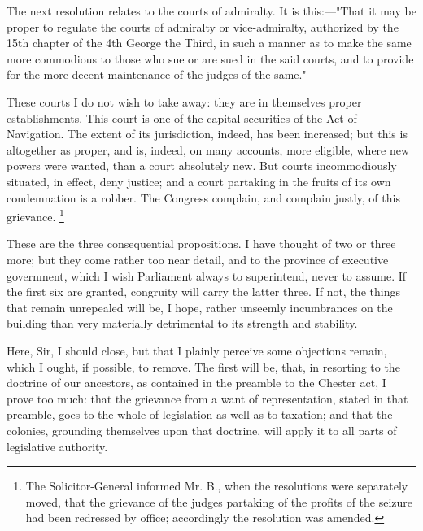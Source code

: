 The next resolution relates to the courts of admiralty. It is this:—"That it may be proper to regulate the courts of admiralty or vice-admiralty, authorized by the 15th chapter of the 4th George the Third, in such a manner as to make the same more commodious to those who sue or are sued in the said courts, and to provide for the more decent maintenance of the judges of the same."

These courts I do not wish to take away: they are in themselves proper establishments. This court is one of the capital securities of the Act of Navigation. The extent of its jurisdiction, indeed, has been increased; but this is altogether as proper, and is, indeed, on many accounts, more eligible, where new powers were wanted, than a court absolutely new. But courts incommodiously situated, in effect, deny justice; and a court partaking in the fruits of its own condemnation is a robber. The Congress complain, and complain justly, of this grievance.
\footnote{The Solicitor-General informed Mr. B., when the resolutions were separately moved, that the grievance of the judges partaking of the profits of the seizure had been redressed by office; accordingly the resolution was amended.}

These are the three consequential propositions. I have thought of two or three more; but they come rather too near detail, and to the province of executive government, which I wish Parliament always to superintend, never to assume. If the first six are granted, congruity will carry the latter three. If not, the things that remain unrepealed will be, I hope, rather unseemly incumbrances on the building than very materially detrimental to its strength and stability.

Here, Sir, I should close, but that I plainly perceive some objections remain, which I ought, if possible, to remove. The first will be, that, in resorting to the doctrine of our ancestors, as contained in the preamble to the Chester act, I prove too much: that the grievance from a want of representation, stated in that preamble, goes to the whole of legislation as well as to taxation; and that the colonies, grounding themselves upon that doctrine, will apply it to all parts of legislative authority.

